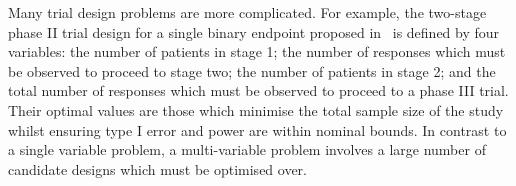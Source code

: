 \documentclass{article} %
\begin{document}


Many trial design problems are more complicated. For example, the two-stage phase II trial design for a single binary endpoint proposed in~\cite{Simon1989} is defined by four variables: the number of patients in stage 1; the number of responses which must be observed to proceed to stage two; the number of patients in stage 2; and the total number of responses which must be observed to proceed to a phase III trial. Their optimal values are those which minimise the total sample size of the study whilst ensuring type I error and power are within nominal bounds. In contrast to a single variable problem, a multi-variable problem involves a large number of candidate designs which must be optimised over. %
\end{document}
